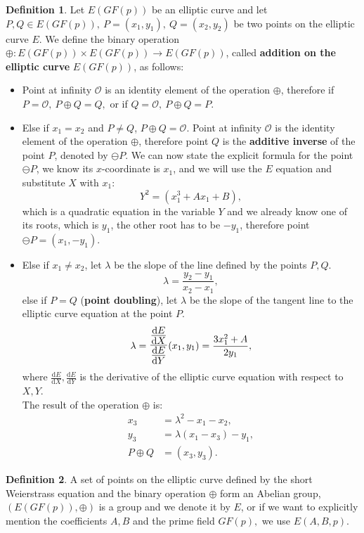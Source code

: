 \documentclass[thesis=M,english]{FITthesis}[2012/10/20]
\theoremstyle{remark}
\theoremstyle{definition}
\newtheorem{DF}{Definition}[section]
\begin{document}
\begin{DF}
Let $E(GF(p))$ be an elliptic curve and let $P,Q \in E(GF(p)),\ P=(x_1,y_1),\ Q=(x_2,y_2)$ be two points on the elliptic curve $E$. We define the binary operation $\oplus: E(GF(p)) \times E(GF(p)) \to E(GF(p))$, called \textbf{addition on the elliptic curve} $E(GF(p))$, as follows:
\begin{itemize}
\item Point at infinity $\mathcal{O}$ is an identity element of the operation $\oplus$, therefore if $P = \mathcal{O},\ P \oplus Q = Q,$ or if $Q = \mathcal{O},\ P \oplus Q = P.$
\item Else if $x_1 = x_2$ and $P\neq Q$, $P\oplus Q = \mathcal{O}.$ Point at infinity $\mathcal{O}$ is the identity element of the operation $\oplus$, therefore point $Q$ is the \textbf{additive inverse} of the point $P$, denoted by $\ominus P$. We can now state the explicit formula for the point $\ominus P$, we know its $x$-coordinate is $x_1$, and we will use the $E$ equation and substitute $X$ with $x_1$:
$$
Y^2  = (x_1^3 + Ax_1 + B),
$$
which is a quadratic equation in the variable $Y$ and we already know one of its roots, which is $y_1$, the other root has to be $-y_1$, therefore point $\ominus P = (x_1, -y_1).$
\item Else if $x_1 \neq x_2$, let $\lambda$ be the slope of the line defined by the points $P,Q.$
$$
\lambda = \frac{y_2 - y_1}{x_2 - x_1},
$$
else if $P = Q$ (\textbf{point doubling}), let $\lambda$ be the slope of the tangent line to the elliptic curve equation at the point $P.$
$$
\lambda = \mathlarger{\mathlarger{\frac{\frac{\mathrm{d}E}{\mathrm{d}X}}{\frac{\mathrm{d}E}{\mathrm{d}Y}}}}(x_1, y_1) = \frac{3x_1^2+ A}{2y_1}, 
$$
where $\frac{\mathrm{d}E}{\mathrm{d}X}, \frac{\mathrm{d}E}{\mathrm{d}Y}$ is the derivative of the elliptic curve equation with respect to $X,Y$. \\
The result of the operation $\oplus$ is:
\begin{align*}
x_3 &= \lambda^2 - x_1 - x_2, \\
y_3 &= \lambda(x_1 - x_3) - y_1, \\ 
 P \oplus Q &= (x_3, y_3).
\end{align*}
\end{itemize}
\end{DF}
\begin{DF}
A set of points on the elliptic curve defined by the short Weierstrass equation and the binary operation $\oplus$ form an Abelian group, $(E(GF(p)), \oplus)$ is a group and we denote it by $E$, or if we want to explicitly mention the coefficients $A,B$ and the prime field $GF(p),$ we use $E(A,B,p)$.
\end{DF}
\end{document}

